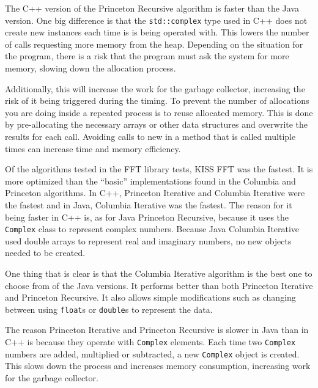 The C++ version of the Princeton Recursive algorithm is faster than the Java version. One big difference is that the \texttt{std::complex} type used in C++ does not create new instances each time is is being operated with. This lowers the number of calls requesting more memory from the heap. Depending on the situation for the program, there is a risk that the program must ask the system for more memory, slowing down the allocation process.

Additionally, this will increase the work for the garbage collector, increasing the risk of it being triggered during the timing. To prevent the number of allocations you are doing inside a repeated process is to reuse allocated memory. This is done by pre-allocating the necessary arrays or other data structures and overwrite the results for each call. Avoiding calls to new in a method that is called multiple times can increase time and memory efficiency.

Of the algorithms tested in the FFT library tests, KISS FFT was the fastest. It is more optimized than the \enquote{basic} implementations found in the Columbia and Princeton algorithms. In C++, Princeton Iterative and Columbia Iterative were the fastest and in Java, Columbia Iterative was the fastest. The reason for it being faster in C++ is, as for Java Princeton Recursive, because it uses the \texttt{Complex} class to represent complex numbers. Because Java Columbia Iterative used double arrays to represent real and imaginary numbers, no new objects needed to be created.



One thing that is clear is that the Columbia Iterative algorithm is the best one to choose from of the Java versions. It performs better than both Princeton Iterative and Princeton Recursive. It also allows simple modifications such as changing between using \texttt{float}s or  \texttt{double}s to represent the data.

The reason Princeton Iterative and Princeton Recursive is slower in Java than in C++ is because they operate with \texttt{Complex} elements. Each time two \texttt{Complex} numbers are added, multiplied or subtracted, a new \texttt{Complex} object is created. This slows down the process and increases memory consumption, increasing work for the garbage collector.

